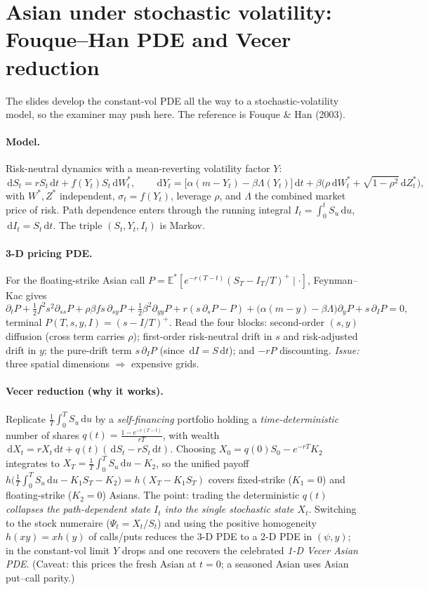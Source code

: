 \documentclass[11pt]{article}
\newcommand{\E}{\mathbb{E}}
\newcommand{\dd}{\,\mathrm{d}}
\begin{document}
\section{Asian under stochastic volatility: Fouque--Han PDE and Vecer reduction}
\label{sec:asiansv}

The slides develop the constant-vol PDE all the way to a stochastic-volatility model, so the examiner
may push here. The reference is Fouque \& Han (2003).

\paragraph{Model.} Risk-neutral dynamics with a mean-reverting volatility factor $Y$:
\[
\dd S_t=rS_t\dd t+f(Y_t)S_t\dd W^*_t,\qquad
\dd Y_t=\big[\alpha(m-Y_t)-\beta\Lambda(Y_t)\big]\dd t
+\beta\big(\rho\dd W^*_t+\sqrt{1-\rho^2}\dd Z^*_t\big),
\]
with $W^*,Z^*$ independent, $\sigma_t=f(Y_t)$, leverage $\rho$, and $\Lambda$ the combined market
price of risk. Path dependence enters through the running integral $I_t=\int_0^t S_u\dd u$,
$\dd I_t=S_t\dd t$. The triple $(S_t,Y_t,I_t)$ is Markov.

\paragraph{3-D pricing PDE.} For the floating-strike Asian call
$P=\E^*[e^{-r(T-t)}(S_T-I_T/T)^+\mid\cdot]$, Feynman--Kac gives
\[
\partial_t P
+\tfrac12 f^2 s^2\partial_{ss}P+\rho\beta f s\,\partial_{sy}P+\tfrac12\beta^2\partial_{yy}P
+r(s\,\partial_s P-P)
+\big(\alpha(m-y)-\beta\Lambda\big)\partial_y P
+s\,\partial_I P=0,
\]
terminal $P(T,s,y,I)=(s-I/T)^+$. Read the four blocks: second-order $(s,y)$ diffusion (cross term
carries $\rho$); first-order risk-neutral drift in $s$ and risk-adjusted drift in $y$; the pure-drift
term $s\,\partial_I P$ (since $\dd I=S\dd t$); and $-rP$ discounting. \emph{Issue:} three spatial
dimensions $\Rightarrow$ expensive grids.

\paragraph{Vecer reduction (why it works).} Replicate $\frac1T\int_0^T S_u\dd u$ by a
\emph{self-financing} portfolio holding a \emph{time-deterministic} number of shares
$q(t)=\frac{1-e^{-r(T-t)}}{rT}$, with wealth
$\dd X_t=rX_t\dd t+q(t)(\dd S_t-rS_t\dd t)$. Choosing $X_0=q(0)S_0-e^{-rT}K_2$ integrates to
$X_T=\frac1T\int_0^T S_u\dd u-K_2$, so the unified payoff $h\!\big(\frac1T\int_0^T S_u\dd u-K_1S_T-K_2\big)=h(X_T-K_1S_T)$ covers fixed-strike ($K_1=0$) and floating-strike ($K_2=0$) Asians. The point: trading
the deterministic $q(t)$ \emph{collapses the path-dependent state $I_t$ into the single stochastic
state $X_t$}. Switching to the stock numeraire ($\Psi_t=X_t/S_t$) and using the positive homogeneity
$h(xy)=xh(y)$ of calls/puts reduces the 3-D PDE to a 2-D PDE in $(\psi,y)$; in the constant-vol limit
$Y$ drops and one recovers the celebrated \emph{1-D Vecer Asian PDE}. (Caveat: this prices the fresh
Asian at $t=0$; a seasoned Asian uses Asian put--call parity.)
\end{document}
